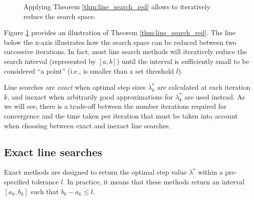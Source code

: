 \begin{figure}[H]
	\caption{Applying Theorem \ref{thm:line_search_red} allows to iteratively reduce the search space.}\label{fig:line_search_reduction}
\end{figure}

Figure \ref{fig:line_search_reduction} provides an illustration of Theorem \ref{thm:line_search_red}. The line below the x-axis illustrates how the search space can be reduced between two successive iterations. In fact, most line search methods will iteratively reduce the search interval (represented by $[a,b]$) until the interval is sufficiently small to be considered ``a point'' (i.e., is smaller than a set threshold $l$).

Line searches are \emph{exact} when optimal step sizes $\lambda_k^*$ are calculated at each iteration $k$, and inexact when arbitrarily good approximations for $\lambda_k^*$ are used instead. As we will see, there is a trade-off between the number iterations required for convergence and the time taken per iteration that must be taken into account when choosing between exact and inexact line searches.

\subsection{Exact line searches}

Exact methods are designed to return the optimal step value $\lambda^*$ within a pre-specified tolerance $l$. In practice, it means that these methods return an interval $[a_k, b_k]$ such that $b_k - a_k \leq l$. 

